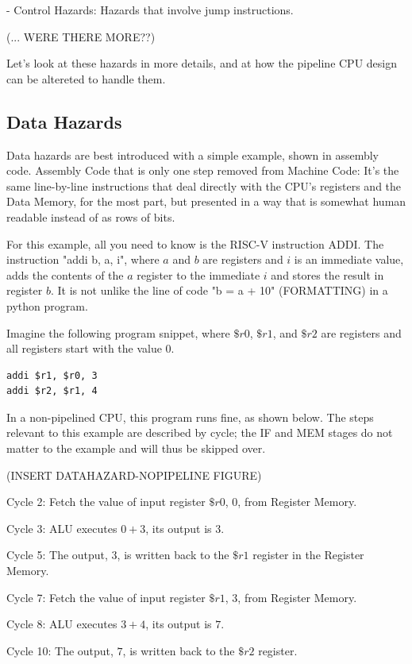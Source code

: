 \documentclass[12pt,twoside]{reedthesis}
\begin{document}
- Control Hazards: Hazards that involve jump instructions.

(... WERE THERE MORE??)

Let's look at these hazards in more details, and at how the pipeline CPU design can be altereted to handle them.

\subsection{Data Hazards}

Data hazards are best introduced with a simple example, shown in assembly code. Assembly Code that is only one step removed from Machine Code: It's the same line-by-line instructions that deal directly with the CPU's registers and the Data Memory, for the most part, but presented in a way that is somewhat human readable instead of as rows of bits.

For this example, all you need to know is the RISC-V instruction ADDI. The instruction "addi b, a, i", where $a$ and $b$ are registers and $i$ is an immediate value, adds the contents of the $a$ register to the immediate $i$ and stores the result in register $b$. It is not unlike the line of code "b = a + 10" (FORMATTING) in a python program.

Imagine the following program snippet, where $\$r0$, $\$r1$, and $\$r2$ are registers and all registers start with the value 0.

\begin{verbatim}
addi $r1, $r0, 3
addi $r2, $r1, 4
\end{verbatim}

In a non-pipelined CPU, this program runs fine, as shown below. The steps relevant to this example are described by cycle; the IF and MEM stages do not matter to the example and will thus be skipped over.

(INSERT DATAHAZARD-NOPIPELINE FIGURE)

Cycle 2: Fetch the value of input register $\$r0$, $0$, from Register Memory.

Cycle 3: ALU executes $0 + 3$, its output is $3$.

Cycle 5: The output, $3$, is written back to the $\$r1$ register in the Register Memory.

Cycle 7: Fetch the value of input register $\$r1$, $3$, from Register Memory.

Cycle 8: ALU executes $3 + 4$, its output is $7$.

Cycle 10: The output, $7$, is written back to the $\$r2$ register.
\end{document}
